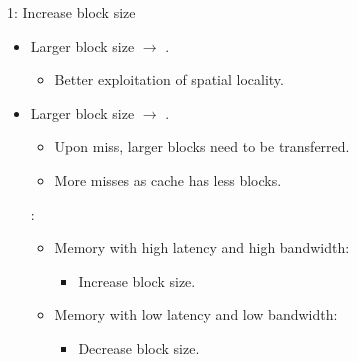 \begin{frame}[t]{1: Increase block size}
\begin{itemize}
  \item Larger block size $\rightarrow$ .
    \begin{itemize}
       \item Better exploitation of spatial locality.
    \end{itemize}

  \item Larger block size $\rightarrow$ .
    \begin{itemize}
      \item Upon miss, larger blocks need to be transferred.
      \item More misses as cache has less blocks.
    \end{itemize}

  :
    \begin{itemize}
      \item Memory with high latency and high bandwidth:
        \begin{itemize}
          \item Increase block size.
        \end{itemize}
      \item Memory with low latency and low bandwidth:
        \begin{itemize}
          \item Decrease block size.
        \end{itemize}
    \end{itemize}
\end{itemize}
\end{frame}


